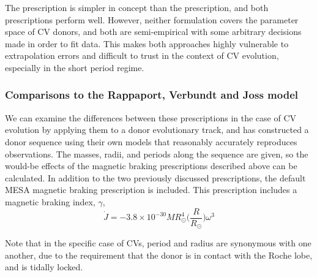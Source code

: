 The \citet{garraffo2018a} prescription is simpler in concept than the \citet{matt2015} prescription, and both prescriptions perform well. However, neither formulation covers the parameter space of CV donors, and both are semi-empirical with some arbitrary decisions made in order to fit data. This makes both approaches highly vulnerable to extrapolation errors and difficult to trust in the context of CV evolution, especially in the short period regime.


\subsubsection{Comparisons to the Rappaport, Verbundt and Joss model}

We can examine the differences between these prescriptions in the case of CV evolution by applying them to a donor evolutionary track, and \citet{knigge11} has constructed a donor sequence using their own models that reasonably accurately reproduces observations. The masses, radii, and periods along the sequence are given, so the would-be effects of the magnetic braking prescriptions described above can be calculated. In addition to the two previously discussed prescriptions, the default MESA \citep{Paxton_2015} magnetic braking prescription \citep{rappaport1983} is included. This prescription includes a magnetic braking index, $\gamma$,
\begin{equation}
    \dot J = -3.8\times10^{-30} M R_\odot^4 \bigg( \frac{R}{R_\odot} \bigg) \omega^3
\end{equation}

Note that in the specific case of CVs, period and radius are synonymous with one another, due to the requirement that the donor is in contact with the Roche lobe, and is tidally locked. 

